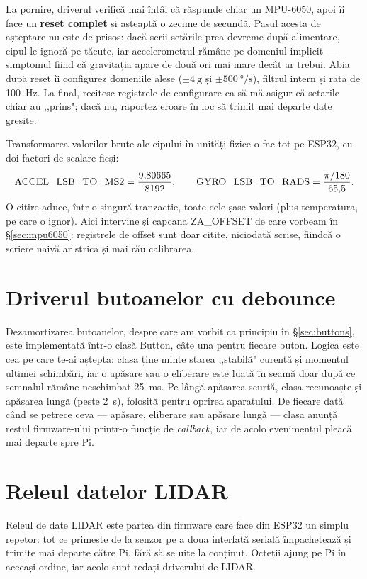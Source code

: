 \documentclass[a4paper,12pt,twoside,openany]{report}
\renewcommand{\texttt}[1]{\textnormal{#1}}
\begin{document}
La pornire, driverul verifică mai întâi că răspunde chiar un MPU-6050, apoi îi
face un \textbf{reset complet} și așteaptă o zecime de secundă. Pasul acesta de
așteptare nu este de prisos: dacă scrii setările prea devreme după alimentare,
cipul le ignoră pe tăcute, iar accelerometrul rămâne pe domeniul implicit —
simptomul fiind că gravitația apare de două ori mai mare decât ar trebui. Abia
după reset îi configurez domeniile alese ($\pm\SI{4}{\g}$ și
$\pm\SI{500}{\degree\per\second}$), filtrul intern și rata de \SI{100}{\hertz}.
La final, recitesc registrele de configurare ca să mă asigur că setările chiar
au ,,prins"; dacă nu, raportez eroare în loc să trimit mai departe date greșite.

Transformarea valorilor brute ale cipului în unități fizice o fac tot pe ESP32,
cu doi factori de scalare ficși:
\[
\texttt{ACCEL\_LSB\_TO\_MS2} = \frac{9{,}80665}{8192}, \qquad
\texttt{GYRO\_LSB\_TO\_RADS} = \frac{\pi/180}{65{,}5}.
\]
O citire aduce, într-o singură tranzacție, toate cele șase valori (plus
temperatura, pe care o ignor). Aici intervine și capcana \texttt{ZA\_OFFSET}
de care vorbeam în §\ref{sec:mpu6050}: registrele de offset sunt doar citite,
niciodată scrise, fiindcă o scriere naivă ar strica și mai rău calibrarea.

\section{Driverul butoanelor cu debounce}
\label{sec:btn-driver}

Dezamortizarea butoanelor, despre care am vorbit ca principiu în
§\ref{sec:buttons}, este implementată într-o clasă \texttt{Button}, câte una
pentru fiecare buton. Logica este cea pe care te-ai aștepta: clasa ține minte
starea ,,stabilă" curentă și momentul ultimei schimbări, iar o apăsare sau o
eliberare este luată în seamă doar după ce semnalul rămâne neschimbat
\SI{25}{\milli\second}. Pe lângă apăsarea scurtă, clasa recunoaște și apăsarea
lungă (peste \SI{2}{\second}), folosită pentru oprirea aparatului. De fiecare
dată când se petrece ceva — apăsare, eliberare sau apăsare lungă — clasa
anunță restul firmware-ului printr-o funcție de \textit{callback}, iar de acolo
evenimentul pleacă mai departe spre Pi.

\section{Releul datelor LIDAR}
\label{sec:lidar-relay}

Releul de date LIDAR este partea din firmware care face din ESP32 un simplu
repetor: tot ce primește de la senzor pe a doua interfață serială împachetează
și trimite mai departe către Pi, fără să se uite la conținut. Octeții ajung pe
Pi în aceeași ordine, iar acolo sunt redați driverului de LIDAR.
\end{document}

